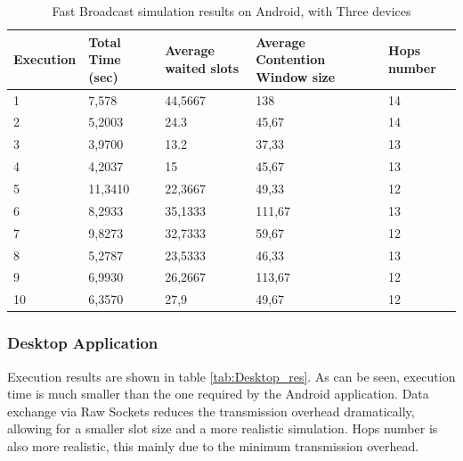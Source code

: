 \begin{table}
\caption{Fast Broadcast simulation results on Android, with Three devices}
\label{tab:Android_res}
\centering
\begin{tabular}{|m{}|m{}|m{}|m{}|m{}|}
\hline
Execution & Total \newline Time (sec) & Average waited slots & Average Contention Window size & Hops \newline number \\
\hline
1 & 7,578		& 44,5667 	& 138		& 14 \\
\hline
2 & 5,2003	 	& 24.3	  	& 45,67		& 14 \\ 
\hline
3 & 3,9700		& 13.2	 	& 37,33		& 13 \\  
\hline
4 & 4,2037	 	& 15	  	& 45,67		& 13 \\ 
\hline
5 & 11,3410		& 22,3667	& 49,33		& 12 \\ 
\hline
6 & 8,2933	 	& 35,1333 	& 111,67 	& 13 \\  
\hline
7 & 9,8273	 	& 32,7333  	& 59,67 	& 12 \\ 
\hline
8 & 5,2787	 	& 23,5333	& 46,33	 	& 13 \\ 
\hline
9 & 6,9930	 	& 26,2667   & 113,67 	& 12 \\ 
\hline
10 & 6,3570 	& 27,9		& 49,67 	& 12 \\ 
\hline
\end{tabular}
\end{table}  

\subsubsection{Desktop Application}

Execution results are shown in table \ref{tab:Desktop_res}. As can be seen, execution time is much smaller than the one required by the Android application. Data exchange via Raw Sockets reduces the transmission overhead dramatically, allowing for a smaller slot size and a more realistic simulation. Hops number is also more realistic, this mainly due to the minimum transmission overhead. 

